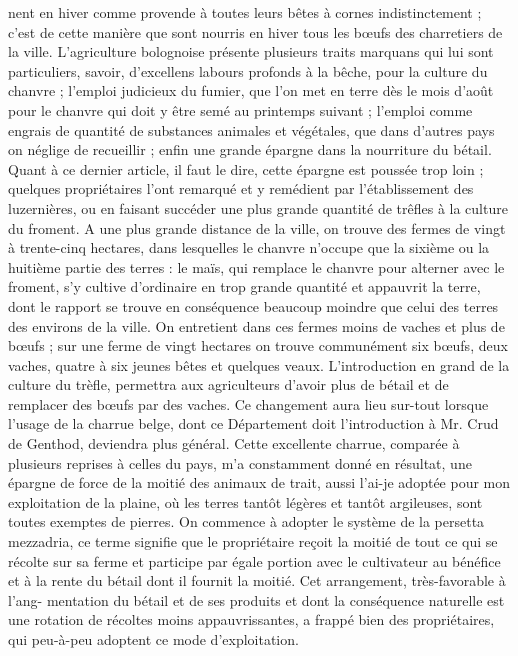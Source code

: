 nent en hiver comme provende à toutes leurs bêtes à cornes indistinctement ; c'est de cette manière que sont nourris en hiver tous les bœufs des charretiers de la ville. L'agriculture bolognoise présente plusieurs traits marquans qui lui sont particuliers, savoir, d'excellens labours profonds à la bêche, pour la culture du chanvre ; l'emploi judicieux du fumier, que l'on met en terre dès le mois d'août pour le chanvre qui doit y être semé au printemps suivant ; l'emploi comme engrais de quantité de substances animales et végétales, que dans d'autres pays on néglige de recueillir ; enfin une grande épargne dans la nourriture du bétail. Quant à ce dernier article, il faut le dire, cette épargne est poussée trop loin ; quelques propriétaires l'ont remarqué et y remédient par l'établissement des luzernières, ou en faisant succéder une plus grande quantité de trêfles à la culture du froment. A une plus grande distance de la ville, on trouve des fermes de vingt à trente-cinq hectares, dans lesquelles le chanvre n'occupe que la sixième ou la huitième partie des terres : le maïs, qui remplace le chanvre pour alterner avec le froment, s'y cultive d'ordinaire en trop grande quantité et\setcounter{page}{178} appauvrit la terre, dont le rapport se trouve en conséquence beaucoup moindre que celui des terres des environs de la ville. On entretient dans ces fermes moins de vaches et plus de bœufs ; sur une ferme de vingt hectares on trouve communément six bœufs, deux vaches, quatre à six jeunes bêtes et quelques veaux.
L’introduction en grand de la culture du trèfle, permettra aux agriculteurs d’avoir plus de bétail et de remplacer des bœufs par des vaches. Ce changement aura lieu sur-tout lorsque l’usage de la charrue belge, dont ce Département doit l’introduction à Mr. Crud de Genthod, deviendra plus général. Cette excellente charrue, comparée à plusieurs reprises à celles du pays, m’a constamment donné en résultat, une épargne de force de la moitié des animaux de trait, aussi l’ai-je adoptée pour mon exploitation de la plaine, où les terres tantôt légères et tantôt argileuses, sont toutes exemptes de pierres.
On commence à adopter le système de la persetta mezzadria, ce terme signifie que le propriétaire reçoit la moitié de tout ce qui se récolte sur sa ferme et participe par égale portion avec le cultivateur au bénéfice et à la rente du bétail dont il fournit la moitié. Cet arrangement, très-favorable à l’ang-\setcounter{page}{179} mentation du bétail et de ses produits et dont la conséquence naturelle est une rotation de récoltes moins appauvrissantes, a frappé bien des propriétaires, qui peu-à-peu adoptent ce mode d'exploitation.
